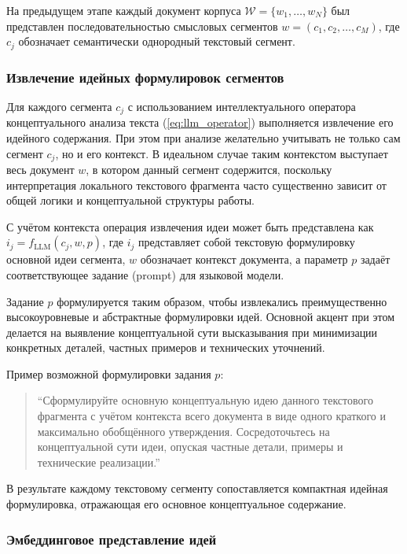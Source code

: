 \documentclass[review,3p,times]{elsarticle}
\begin{document}
На предыдущем этапе каждый документ корпуса $\mathcal{W}=\{w_1,\dots,w_N\}$ был представлен последовательностью смысловых сегментов $w=(c_1,c_2,\dots,c_M)$, где $c_j$ обозначает семантически однородный текстовый сегмент.



\subsubsection{Извлечение идейных формулировок сегментов}

Для каждого сегмента $c_j$ с использованием интеллектуального оператора концептуального анализа текста (\ref{eq:llm_operator}) выполняется извлечение его идейного содержания. При этом при анализе желательно учитывать не только сам сегмент $c_j$, но и его контекст. В идеальном случае таким контекстом выступает весь документ $w$, в котором данный сегмент содержится, поскольку интерпретация локального текстового фрагмента часто существенно зависит от общей логики и концептуальной структуры работы.

С учётом контекста операция извлечения идеи может быть представлена как $i_j = f_{\mathrm{LLM}}(c_j, w, p)$, где $i_j$ представляет собой текстовую формулировку основной идеи сегмента, $w$ обозначает контекст документа, а параметр $p$ задаёт соответствующее задание (prompt) для языковой модели.

Задание $p$ формулируется таким образом, чтобы извлекались преимущественно высокоуровневые и абстрактные формулировки идей. Основной акцент при этом делается на выявление концептуальной сути высказывания при минимизации конкретных деталей, частных примеров и технических уточнений.

Пример возможной формулировки задания $p$:

\begin{quote}
``Сформулируйте основную концептуальную идею данного текстового фрагмента с учётом контекста всего документа в виде одного краткого и максимально обобщённого утверждения. Сосредоточьтесь на концептуальной сути идеи, опуская частные детали, примеры и технические реализации.''
\end{quote}

В результате каждому текстовому сегменту сопоставляется компактная идейная формулировка, отражающая его основное концептуальное содержание.



\subsubsection{Эмбеддинговое представление идей}
\end{document}
